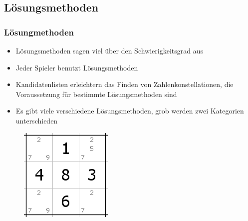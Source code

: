 \documentclass[accentcolor=tud6b,colorbacktitle,inverttitle,landscape,german,presentation,t]{tudbeamer}
\begin{document}
	\subsection{Lösungsmethoden}
		\begin{frame}
		\frametitle{Lösungmethoden}
		\begin{itemize}
		\item Lösungsmethoden sagen viel über den Schwierigkeitsgrad aus
		\item Jeder Spieler benutzt Lösungsmethoden
		\item Kandidatenlisten erleichtern das Finden von Zahlenkonstellationen, die Voraussetzung für bestimmte Lösungsmethoden sind
		\item Es gibt viele verschiedene Lösungsmethoden, grob werden zwei Kategorien unterschieden
		\end{itemize}
		\begin{figure}[Hh]
    		\includegraphics[width=\textwidth-270pt,height=\textheight,keepaspectratio]{./img/kandidatenlisten.png}
		\end{figure}
		\end{frame}
\end{document}
